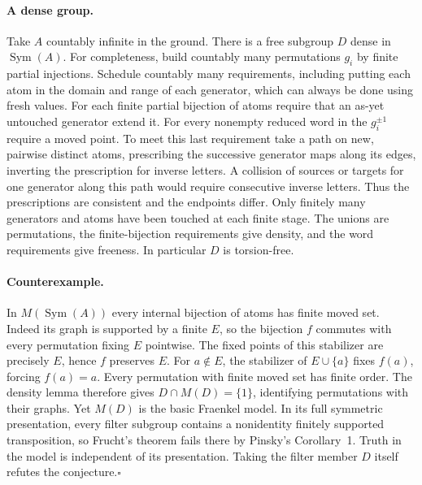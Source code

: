 \documentclass[11pt]{article}
\begin{document}
\paragraph{A dense group.} Take $A$ countably infinite in the ground. There is a free subgroup $D$ dense in $\operatorname{Sym}(A)$. For completeness, build countably many permutations $g_i$ by finite partial injections. Schedule countably many requirements, including putting each atom in the domain and range of each generator, which can always be done using fresh values. For each finite partial bijection of atoms require that an as-yet untouched generator extend it. For every nonempty reduced word in the $g_i^{\pm1}$ require a moved point. To meet this last requirement take a path on new, pairwise distinct atoms, prescribing the successive generator maps along its edges, inverting the prescription for inverse letters. A collision of sources or targets for one generator along this path would require consecutive inverse letters. Thus the prescriptions are consistent and the endpoints differ. Only finitely many generators and atoms have been touched at each finite stage. The unions are permutations, the finite-bijection requirements give density, and the word requirements give freeness. In particular $D$ is torsion-free.

\paragraph{Counterexample.} In $M(\operatorname{Sym}(A))$ every internal bijection of atoms has finite moved set. Indeed its graph is supported by a finite $E$, so the bijection $f$ commutes with every permutation fixing $E$ pointwise. The fixed points of this stabilizer are precisely $E$, hence $f$ preserves $E$. For $a\notin E$, the stabilizer of $E\cup\{a\}$ fixes $f(a)$, forcing $f(a)=a$. Every permutation with finite moved set has finite order. The density lemma therefore gives $D\cap M(D)=\{1\}$, identifying permutations with their graphs. Yet $M(D)$ is the basic Fraenkel model. In its full symmetric presentation, every filter subgroup contains a nonidentity finitely supported transposition, so Frucht's theorem fails there by Pinsky's Corollary~1. Truth in the model is independent of its presentation. Taking the filter member $D$ itself refutes the conjecture.\hfill$\square$
\end{document}
